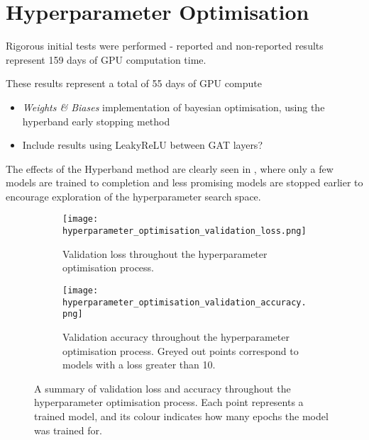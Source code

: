 \section{Hyperparameter Optimisation}
\label{sec:hyperparameter_optimisation}

Rigorous initial tests were performed - reported and non-reported results represent 159 days of GPU computation time.

These results represent a total of 55 days of GPU compute

{\color{red}
  \begin{itemize}
    \item \textit{Weights \& Biases} \cite{wandb} implementation of bayesian optimisation, using the hyperband early stopping method
    \item Include results using LeakyReLU between GAT layers?
  \end{itemize}
}



The effects of the Hyperband method are clearly seen in \figureautorefname{ \ref{fig:hyperparameter_optimisation_validation_loss_and_accuracy}}, where only a few models are trained to completion and less promising models are stopped earlier to encourage exploration of the hyperparameter search space.

\begin{figure}
    \centering
    \begin{subfigure}[t]{\textwidth}
        \texttt{[image: hyperparameter\_optimisation\_validation\_loss.png]}
        \label{fig:hyperparameter_optimisation_validation_loss}
        \caption{Validation loss throughout the hyperparameter optimisation process.}
    \end{subfigure}
    \par\bigskip %
    \par\bigskip
    \begin{subfigure}[b]{\textwidth}
        \texttt{[image: hyperparameter\_optimisation\_validation\_accuracy.png]}
        \label{fig:hyperparameter_optimisation_validation_accuracy}
        \caption{Validation accuracy throughout the hyperparameter optimisation process. Greyed out points correspond to models with a loss greater than 10.}
    \end{subfigure}
    \caption{A summary of validation loss and accuracy throughout the hyperparameter optimisation process. Each point represents a trained model, and its colour indicates how many epochs the model was trained for.}
    \label{fig:hyperparameter_optimisation_validation_loss_and_accuracy}
\end{figure}


